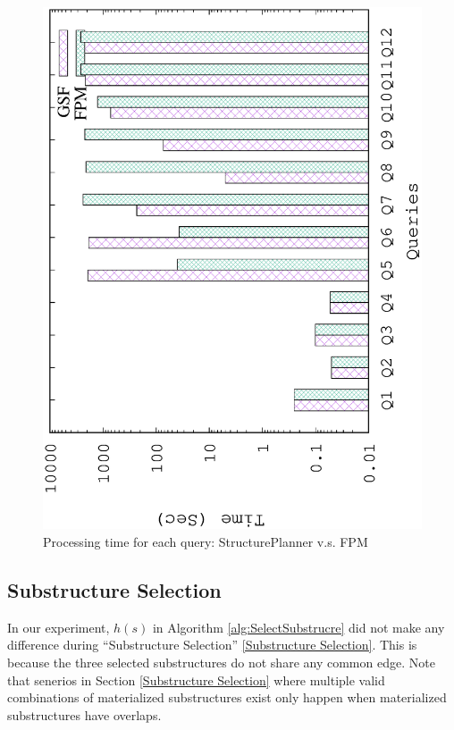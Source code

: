 \begin{figure}[H]
	\centering
	\includegraphics[scale=0.5, angle=270]{plot/qfpm}
	\caption{Processing time for each query: StructurePlanner v.s. FPM}
	\label{fig:qfpm}
\end{figure}


\subsection{Substructure Selection}

In our experiment, $h(s)$ in Algorithm \ref{alg:SelectSubstrucre} did not make any difference during ``Substructure Selection'' \ref{Substructure Selection}. This is because the three selected substructures do not share any common edge. Note that senerios in Section \ref{Substructure Selection} where multiple valid combinations of materialized substructures exist only happen when materialized substructures have overlaps. 

